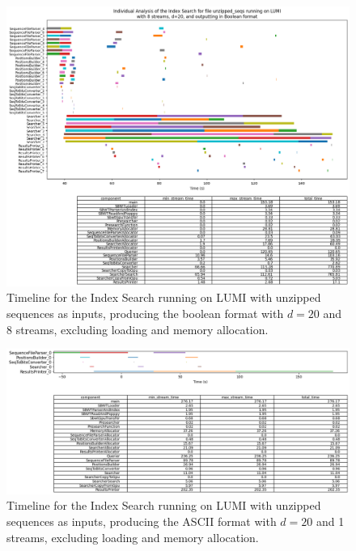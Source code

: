 \begin{figure}[t]
  \centering
  \includegraphics[width=\textwidth]{images/LumiIndexUnzippedD20S8Boolean.png}
  \caption{Timeline for the Index Search running on LUMI with unzipped sequences as inputs, producing the boolean format with $d=20$ and 8 streams, excluding loading and memory allocation.}\label{fig:LumiIndexUnzippedD20S8Boolean}
\end{figure}

\begin{figure}[t]
  \centering
  \includegraphics[width=\textwidth]{images/LumiIndexUnzippedD20S1ASCII.png}
  \caption{Timeline for the Index Search running on LUMI with unzipped sequences as inputs, producing the ASCII format with $d=20$ and 1 streams, excluding loading and memory allocation.}\label{fig:LumiIndexUnzippedD20S1ASCII}
\end{figure}

